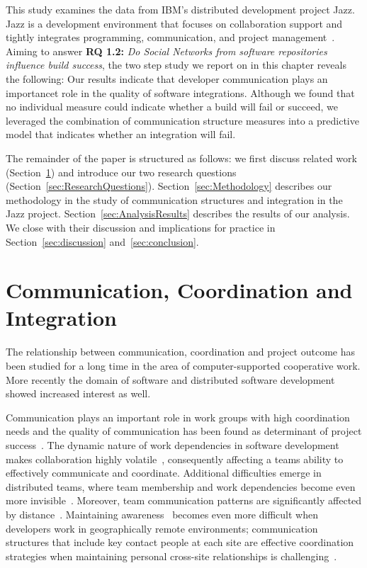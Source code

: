 This study examines the data from IBM's distributed development project Jazz. Jazz
is a development environment that focuses on collaboration support and tightly
integrates programming, communication, and project
management~\cite{frost:ieeesoftware:2007}. 
Aiming to answer \textbf{RQ 1.2:} \emph{Do Social Networks from software repositories influence build success},  the two step study we report on in this chapter reveals the following: Our
results indicate that developer communication plays an importancet role in the
quality of software integrations. Although we found that no individual measure
could indicate whether a build will fail or succeed, we leveraged the combination
of communication structure measures into a predictive model that indicates
whether an integration will fail.

The remainder of the paper is structured as follows: we first discuss related
work (Section~\ref{sec:RelatedCommunication}) and introduce our two research
questions (Section~\ref{sec:ResearchQuestions}). Section~\ref{sec:Methodology}
describes our methodology in the study of communication structures and
integration in the Jazz project. Section~\ref{sec:AnalysisResults} describes the
results of our analysis. We close with their discussion and implications for
practice in Section~\ref{sec:discussion} and~\ref{sec:conclusion}.





\section{Communication, Coordination and Integration}
\label{sec:RelatedCommunication}

The relationship between communication, coordination and project outcome has been
studied for a long time in the area of computer-supported cooperative work. More
recently the domain of software and distributed software development showed
increased interest as well.

Communication plays an important role in work groups with high coordination needs
and the quality of communication has been found as determinant of project
success~\cite{curtis:acm:1988,kraut:1995coordination}. The dynamic nature
of work dependencies in software development makes collaboration highly
volatile~\cite{Cataldo:2007hb}, consequently affecting a teams ability to
effectively communicate and coordinate. Additional difficulties emerge in
distributed teams, where team membership and work dependencies become even more
invisible~\cite{damian:icgse:2007}. Moreover, team communication patterns are
significantly affected by distance~\cite{hinds:cscw:2006}. Maintaining
awareness~\cite{sarma:2006icgse} becomes even more difficult when developers work
in geographically remote environments; communication structures that include key
contact people at each site are effective coordination strategies when
maintaining personal cross-site relationships is challenging~\cite{hinds:cscw:2006}.

